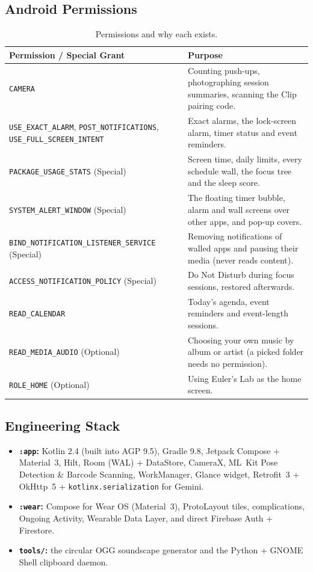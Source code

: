 \documentclass[11pt,a4paper]{article}
\begin{document}
\subsection{Android Permissions}
\begin{table}[H]
\centering
\footnotesize
\begin{tabularx}{\textwidth}{@{}L{5.6cm}Y@{}}
\toprule
\textbf{\sffamily Permission / Special Grant} & \textbf{\sffamily Purpose} \\
\midrule
\texttt{CAMERA} & Counting push-ups, photographing session summaries, scanning the Clip pairing code. \\
\texttt{USE\_EXACT\_ALARM}, \texttt{POST\_NOTIFICATIONS}, \newline \texttt{USE\_FULL\_SCREEN\_INTENT} & Exact alarms, the lock-screen alarm, timer status and event reminders. \\
\texttt{PACKAGE\_USAGE\_STATS} {\scriptsize (Special)} & Screen time, daily limits, every schedule wall, the focus tree and the sleep score. \\
\texttt{SYSTEM\_ALERT\_WINDOW} {\scriptsize (Special)} & The floating timer bubble, alarm and wall screens over other apps, and pop-up covers. \\
\texttt{BIND\_NOTIFICATION\_LISTENER\_\allowbreak SERVICE} {\scriptsize (Special)} & Removing notifications of walled apps and pausing their media (never reads content). \\
\texttt{ACCESS\_NOTIFICATION\_POLICY} {\scriptsize (Special)} & Do Not Disturb during focus sessions, restored afterwards. \\
\texttt{READ\_CALENDAR} & Today's agenda, event reminders and event-length sessions. \\
\texttt{READ\_MEDIA\_AUDIO} {\scriptsize (Optional)} & Choosing your own music by album or artist (a picked folder needs no permission). \\
\texttt{ROLE\_HOME} {\scriptsize (Optional)} & Using Euler's Lab as the home screen. \\
\bottomrule
\end{tabularx}
\caption{Permissions and why each exists.}
\end{table}

\subsection{Engineering Stack}
\begin{itemize}
  \item \textbf{\texttt{:app}:} Kotlin 2.4 (built into AGP 9.5), Gradle 9.8, Jetpack Compose + Material~3, Hilt, Room (WAL) + DataStore, CameraX, ML~Kit Pose Detection \& Barcode Scanning, WorkManager, Glance widget, Retrofit~3 + OkHttp~5 + \texttt{kotlinx.serialization} for Gemini.
  \item \textbf{\texttt{:wear}:} Compose for Wear OS (Material~3), ProtoLayout tiles, complications, Ongoing Activity, Wearable Data Layer, and direct Firebase Auth + Firestore.
  \item \textbf{\texttt{tools/}:} the circular OGG soundscape generator and the Python + GNOME Shell clipboard daemon.
\end{itemize}
\end{document}
